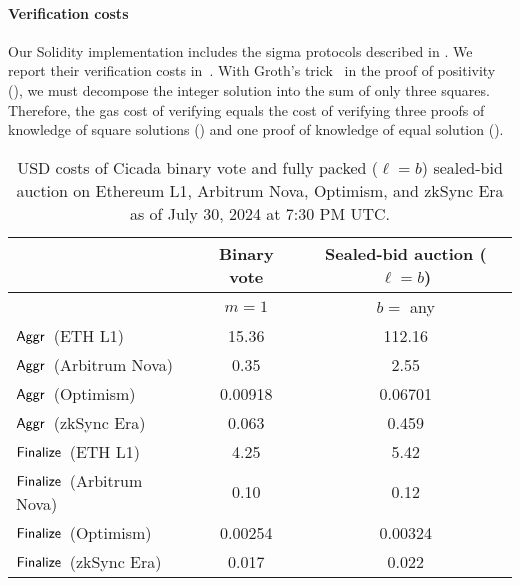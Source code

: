 \paragraph{Verification costs}
Our Solidity implementation includes the sigma protocols described in . We report their verification costs in~. With Groth's trick~\cite{ACNS:Groth05} in the proof of positivity (\zkpopos), we must decompose the integer solution into the sum of only three squares. Therefore, the gas cost of verifying \zkpopos equals the cost of verifying three proofs of knowledge of square solutions (\zkposqs) and one proof of knowledge of equal solution (\zkposeq).

\begin{table*}[ht!]
    \centering
    \setlength{\tabcolsep}{6pt}
    \setlength{\belowbottomsep}{6pt}
    \begin{tabular}{l SS}
        \toprule
        & {\textbf{Binary vote}} & {\textbf{Sealed-bid auction} ($\ell = b$)} \\\midrule
        & {$m=1$} & {$b=$ any} \\\midrule
        $\mathsf{Aggr}$\ (ETH L1)     & 15.36 & 112.16 \\
        $\mathsf{Aggr}$\ (Arbitrum Nova)      & 0.35 & 2.55 \\
        $\mathsf{Aggr}$\ (Optimism)      & 0.00918 & 0.06701 \\
        $\mathsf{Aggr}$\ (zkSync Era)     & 0.063 & 0.459 \\\midrule
        $\mathsf{Finalize}$\ (ETH L1)  & 4.25 & 5.42 \\
        $\mathsf{Finalize}$\ (Arbitrum Nova)  & 0.10 & 0.12 \\
        $\mathsf{Finalize}$\ (Optimism) & 0.00254 & 0.00324 \\
        $\mathsf{Finalize}$\ (zkSync Era)  & 0.017 & 0.022 \\
        \bottomrule
    \end{tabular}
    \caption{USD costs of Cicada binary vote and fully packed ($\ell=b$) sealed-bid auction on Ethereum L1, Arbitrum Nova, Optimism, and zkSync Era as of July 30, 2024 at 7:30 PM UTC.}
    \label{tab:usd_table1}
\end{table*}

